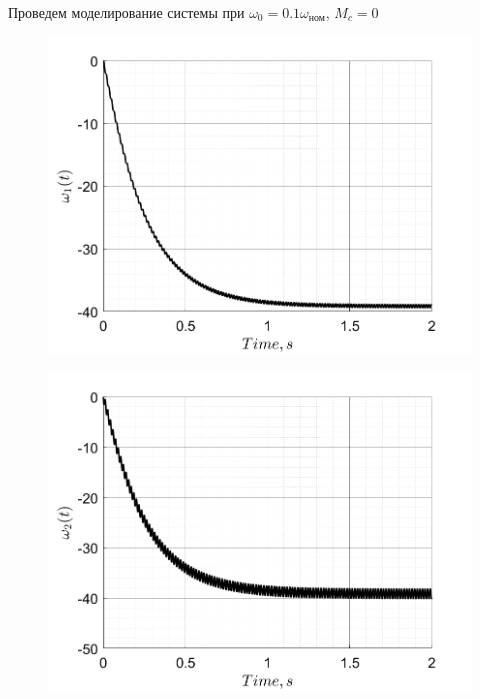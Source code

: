  \newpage
Проведем моделирование системы при $\omega_0 = 0.1\omega_\text{ном}$, $M_c = 0$
\begin{figure}[!h]
    \centering
    \begin{minipage}{0.5\textwidth}
        \centering
        \includegraphics[width = \textwidth]{img/task22_omega1}
        \label{fig:img/task22_omega1}
    \end{minipage}%
    \begin{minipage}{0.5\textwidth}
        \centering
        \includegraphics[width = \textwidth]{img/task22_omega2}
        \label{fig:img/task22_omega2}
    \end{minipage}
    \begin{minipage}{0.5\textwidth}

\end{minipage}
\end{figure}

